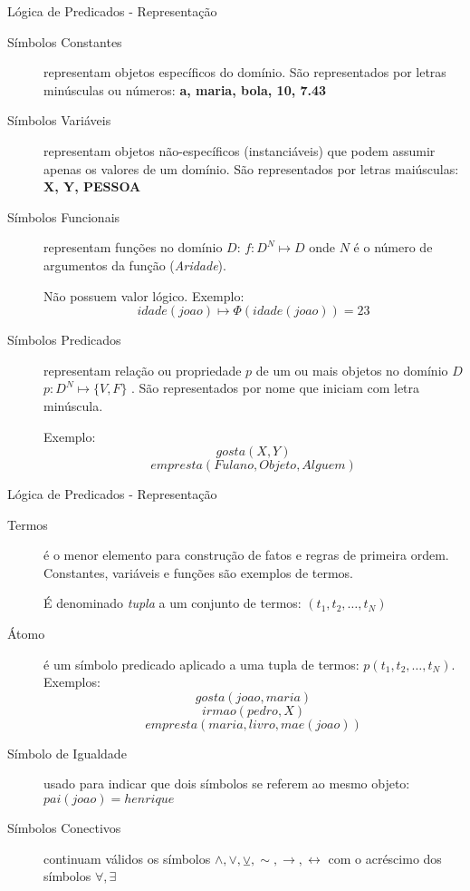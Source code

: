 \begin{frame}[t]{Lógica de Predicados - Representação}
	\begin{footnotesize}
	\begin{description}
	\item [Símbolos Constantes] representam objetos específicos do domínio. São representados por letras minúsculas ou números: {\bf a, maria, bola, 10, 7.43}

	\item [Símbolos Variáveis] representam objetos não-específicos (instanciáveis) que podem assumir apenas os valores de um domínio. São representados por letras maiúsculas: {\bf X, Y, PESSOA}

	\item [Símbolos Funcionais] representam funções no domínio $D$: $f: D^N \mapsto D$ onde $N$ é o número de argumentos da função ({\it Aridade}).

	Não possuem valor lógico. Exemplo: $$idade(joao) \mapsto \Phi(idade(joao)) = 23$$

	\item [Símbolos Predicados] representam relação ou propriedade $p$ de um ou mais objetos no domínio $D$ $p: D^N \mapsto \{ V, F \}$ . São representados por nome que iniciam com letra minúscula.

	Exemplo: $$gosta(X, Y)$$ $$empresta(Fulano, Objeto, Alguem)$$
	\end{description}
	\end{footnotesize}
\end{frame}

\begin{frame}[t]{Lógica de Predicados - Representação}
	\begin{small}
	\begin{description}
	\item [Termos] é o menor elemento para construção de fatos e regras de primeira ordem. Constantes, variáveis e funções são exemplos de termos.

	É denominado {\it tupla} a um conjunto de termos: $(t_1, t_2, \ldots, t_N)$

	\item [Átomo] é um símbolo predicado aplicado a uma tupla de termos: $p(t_1, t_2, \ldots, t_N)$. Exemplos: $$gosta(joao, maria)$$ $$irmao(pedro, X)$$ $$empresta(maria, livro, mae(joao))$$

	\item [Símbolo de Igualdade] usado para indicar que dois símbolos se referem ao mesmo objeto: $pai(joao) = henrique$

	\item [Símbolos Conectivos] continuam válidos os símbolos $\wedge, \vee, \veebar, \sim, \rightarrow, \leftrightarrow$ com o acréscimo dos símbolos $\forall, \exists$
	\end{description}
	\end{small}	
\end{frame}

